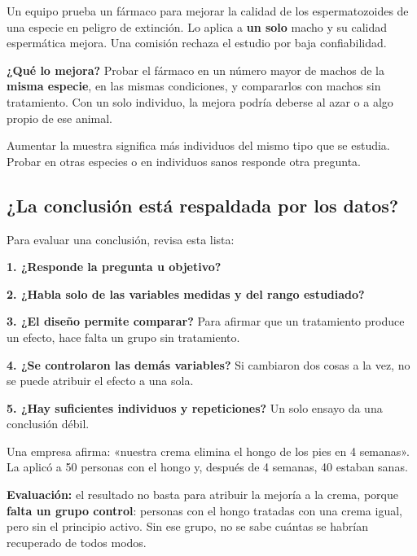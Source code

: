 \begin{ejemplo} Un equipo prueba un fármaco para mejorar la calidad de los espermatozoides de una especie en peligro de extinción. Lo aplica a \textbf{un solo} macho y su calidad espermática mejora. Una comisión rechaza el estudio por baja confiabilidad.\par \textbf{¿Qué lo mejora?} Probar el fármaco en un número mayor de machos de la \textbf{misma especie}, en las mismas condiciones, y compararlos con machos sin tratamiento. Con un solo individuo, la mejora podría deberse al azar o a algo propio de ese animal.\end{ejemplo}
 
\begin{clave}[{Recuerda}] Aumentar la muestra significa más individuos del mismo tipo que se estudia. Probar en otras especies o en individuos sanos responde otra pregunta.\end{clave}
\subsection{¿La conclusión está respaldada por los datos?}
Para evaluar una conclusión, revisa esta lista:

 

\textbf{1. ¿Responde la pregunta u objetivo?}

 

\textbf{2. ¿Habla solo de las variables medidas y del rango estudiado?}

 

\textbf{3. ¿El diseño permite comparar?} Para afirmar que un tratamiento produce un efecto, hace falta un grupo sin tratamiento.

 

\textbf{4. ¿Se controlaron las demás variables?} Si cambiaron dos cosas a la vez, no se puede atribuir el efecto a una sola.

 

\textbf{5. ¿Hay suficientes individuos y repeticiones?} Un solo ensayo da una conclusión débil.

  
\begin{ejemplo} Una empresa afirma: «nuestra crema elimina el hongo de los pies en 4 semanas». La aplicó a 50 personas con el hongo y, después de 4 semanas, 40 estaban sanas.\par \textbf{Evaluación:} el resultado no basta para atribuir la mejoría a la crema, porque \textbf{falta un grupo control}: personas con el hongo tratadas con una crema igual, pero sin el principio activo. Sin ese grupo, no se sabe cuántas se habrían recuperado de todos modos.\end{ejemplo}
 
